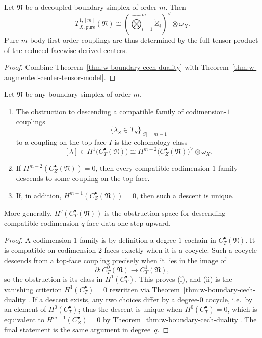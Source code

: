 \begin{corollary}
\label{cor:w-pure-mbody-coupling-theorem}
Let $\mathfrak N$ be a decoupled boundary simplex of order $m$. Then
\[
T^{1,[m]}_{X,\mathrm{pure}}(\mathfrak N)
\cong
\left(\widehat\bigotimes_{i=1}^m \widetilde Z_i\right)^\vee\otimes \omega_X.
\]
Pure $m$-body first-order couplings are thus determined by the full tensor product of the reduced
facewise derived centers.
\end{corollary}

\begin{proof}
Combine Theorem~\ref{thm:w-boundary-cech-duality} with
Theorem~\ref{thm:w-augmented-center-tensor-model}.
\end{proof}

\begin{theorem}
\label{thm:w-higher-mayer-vietoris-couplings}
Let $\mathfrak N$ be any boundary simplex of order $m$.
\begin{enumerate}[label=(\roman*)]
\item The obstruction to descending a compatible family of codimension-$1$ couplings
\[
\{\lambda_S\in T_S\}_{|S|=m-1}
\]
to a coupling on the top face $I$ is the cohomology class
\[
[\lambda]\in H^1\bigl(C_T^\bullet(\mathfrak N)\bigr)
\cong
H^{m-2}\bigl(C_Z^\bullet(\mathfrak N)\bigr)^\vee\otimes \omega_X.
\]
\item If $H^{m-2}(C_Z^\bullet(\mathfrak N))=0$, then every compatible codimension-$1$ family descends to
some coupling on the top face.
\item If, in addition, $H^{m-1}(C_Z^\bullet(\mathfrak N))=0$, then such a descent is unique.
\end{enumerate}
More generally, $H^q(C_T^\bullet(\mathfrak N))$ is the obstruction space for descending compatible
codimension-$q$ face data one step upward.
\end{theorem}

\begin{proof}
A codimension-$1$ family is by definition a degree-$1$ cochain in $C_T^\bullet(\mathfrak N)$. It is
compatible on codimension-$2$ faces exactly when it is a cocycle. Such a cocycle descends from a top-face
coupling precisely when it lies in the image of
\[
\partial\colon C_T^0(\mathfrak N)\to C_T^1(\mathfrak N),
\]
so the obstruction is its class in $H^1(C_T^\bullet)$. This proves (i), and (ii) is the vanishing criterion
$H^1(C_T^\bullet)=0$ rewritten via Theorem~\ref{thm:w-boundary-cech-duality}. If a descent exists, any two
choices differ by a degree-$0$ cocycle, i.e.\ by an element of $H^0(C_T^\bullet)$; thus the descent is unique
when $H^0(C_T^\bullet)=0$, which is equivalent to $H^{m-1}(C_Z^\bullet)=0$ by Theorem~\ref{thm:w-boundary-cech-duality}.
The final statement is the same argument in degree~$q$.
\end{proof}

